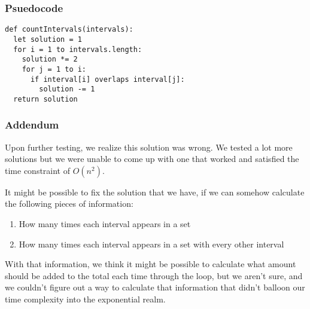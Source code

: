 \documentclass[letterpaper, 12pt]{math}
\begin{document}
\subsubsection*{Psuedocode}
\begin{lstlisting}
def countIntervals(intervals):
  let solution = 1
  for i = 1 to intervals.length:
    solution *= 2
    for j = 1 to i:
      if interval[i] overlaps interval[j]:
        solution -= 1
  return solution
\end{lstlisting}

\subsubsection*{Addendum}
Upon further testing, we realize this solution was wrong. We tested a lot more
solutions but we were unable to come up with one that worked and satisfied
the time constraint of \( O(n^2) \).

It might be possible to fix the solution that we have, if we can somehow
calculate the following pieces of information:
\begin{enumerate}
  \item How many times each interval appears in a set
  \item How many times each interval appears in a set with every other interval
\end{enumerate}

With that information, we think it might be possible to calculate what amount
should be added to the total each time through the loop, but we aren't sure,
and we couldn't figure out a way to calculate that information that didn't
balloon our time complexity into the exponential realm.
\end{document}

